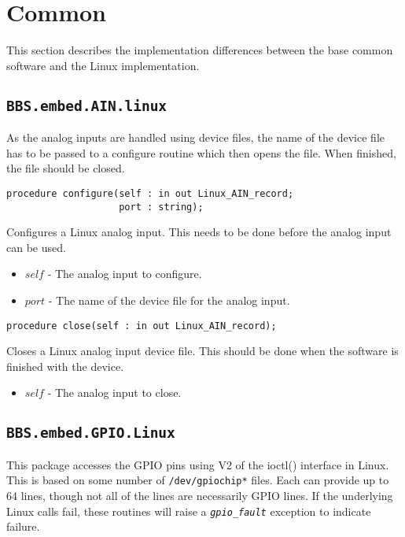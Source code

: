 \documentclass[10pt, openany]{book}
\newcommand{\indexfunc}[1]{\index[func]{#1}}
\newcommand{\package}[1]{\texttt{#1}}
\newcommand{\constant}[1]{\emph{\texttt{#1}}}
\newcommand{\filename}[1]{\texttt{#1}}
\begin{document}
\section{Common}
This section describes the implementation differences between the base common software and the Linux implementation.

\subsection{\package{BBS.embed.AIN.linux}}
As the analog inputs are handled using device files, the name of the device file has to be passed to a configure routine which then opens the file.  When finished, the file should be closed.

\begin{lstlisting}
procedure configure(self : in out Linux_AIN_record;
                    port : string);
\end{lstlisting}
\indexfunc{configure}
Configures a Linux analog input.  This needs to be done before the analog input can be used.
\begin{itemize}
  \item $self$ - The analog input to configure.
  \item $port$ - The name of the device file for the analog input.
\end{itemize}

\begin{lstlisting}
procedure close(self : in out Linux_AIN_record);
\end{lstlisting}
\indexfunc{close}
Closes a Linux analog input device file.  This should be done when the software is finished with the device.
\begin{itemize}
  \item $self$ - The analog input to close.
\end{itemize}

\subsection{\package{BBS.embed.GPIO.Linux}}
This package accesses the GPIO pins using V2 of the ioctl() interface in Linux.  This is based on some number of \filename{/dev/gpiochip*} files.  Each can provide up to 64 lines, though not all of the lines are necessarily GPIO lines.  If the underlying Linux calls fail, these routines will raise a \constant{gpio\_fault} exception to indicate failure.
\end{document}
